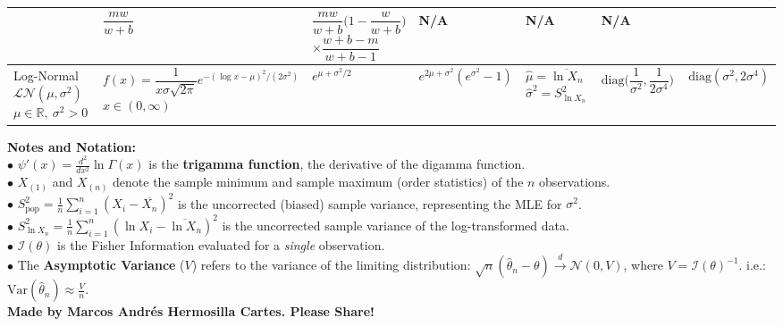 \documentclass[8pt,a4paper]{extarticle}
\newcommand{\Var}{\mathrm{Var}}
\newcommand{\1}{\mathds{1}}
\begin{document}
\begin{table}[htpb]
{\begin{tabular}{@{}m{0.16\linewidth}m{0.26\linewidth}m{0.08\linewidth}m{0.14\linewidth}m{0.14\linewidth}m{0.15\linewidth}m{0.12\linewidth}@{}}
    & $\dfrac{mw}{w+b}$ & $\dfrac{mw}{w+b}\big(1-\dfrac{w}{w+b}\big)$ \newline $\times\dfrac{w+b-m}{w+b-1}$
    & N/A
    & N/A
    & N/A
    \\ \hline \hline
    Log-Normal \newline $\mathcal{LN}(\mu,\sigma^2)$ \newline $\mu \in \mathbb{R},\ \sigma^2 > 0$
    & $f(x)=\dfrac{1}{x\sigma\sqrt{2\pi}}e^{-(\log x-\mu)^2/(2\sigma^2)}$ \newline $x\in(0,\infty)$
    & $e^{\mu+\sigma^2/2}$ & $e^{2\mu+\sigma^2}(e^{\sigma^2}-1)$
    & $\hat{\mu}=\overline{\ln X_n}$ \newline $\hat{\sigma}^2=S^2_{\ln X_n}$
    & $\mathrm{diag}\Big(\dfrac{1}{\sigma^2}, \dfrac{1}{2\sigma^4}\Big)$
    & $\mathrm{diag}(\sigma^2, 2\sigma^4)$
    \\ \hline
    \end{tabular}%
    }

    \vspace{0.75em}
    \noindent\small\textbf{Notes and Notation:}\\
    $\bullet$ $\psi'(x) = \frac{d^2}{dx^2} \ln \Gamma(x)$ is the \textbf{trigamma function}, the derivative of the digamma function.\\
    $\bullet$ $X_{(1)}$ and $X_{(n)}$ denote the sample minimum and sample maximum (order statistics) of the $n$ observations.\\
    $\bullet$ $S^2_{\text{pop}} = \frac{1}{n}\sum_{i=1}^n (X_i - \overline{X_n})^2$ is the uncorrected (biased) sample variance, representing the MLE for $\sigma^2$.\\
    $\bullet$ $S^2_{\ln X_n} = \frac{1}{n}\sum_{i=1}^n (\ln X_i - \overline{\ln X_n})^2$ is the uncorrected sample variance of the log-transformed data.\\
    $\bullet$ $\mathcal{I}(\theta)$ is the Fisher Information evaluated for a \textit{single} observation.\\
    $\bullet$ The \textbf{Asymptotic Variance} ($V$) refers to the variance of the limiting distribution: $\sqrt{n}(\hat{\theta}_n - \theta) \xrightarrow{d} \mathcal{N}(0, V)$, where $V = \mathcal{I}(\theta)^{-1}$. i.e.: $\Var(\hat{\theta}_n) \approx \frac{V}{n}$.
    \\ \textbf{Made by Marcos Andrés Hermosilla Cartes. Please Share!}
\end{table}
\end{document}
